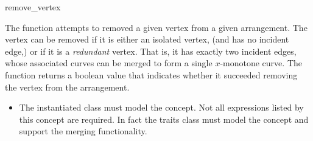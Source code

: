 \ccRefPageBegin

\begin{ccRefFunction}{remove_vertex}

\ccDefinition

The function \ccRefName{} attempts to removed a given vertex from a given
arrangement. The vertex can be removed if it is either an isolated vertex,
(and has no incident edge,) or if it is a {\em redundant} vertex. That
is, it has exactly two incident edges, whose associated curves can be
merged to form a single $x$-monotone curve.
The function returns a boolean value that indicates whether it succeeded
removing the vertex from the arrangement.



\ccRequirements
\begin{itemize}
\item The instantiated  class must model the
   concept. Not all expressions listed 
  by this concept are required. In fact the traits class must model the 
   concept and support the merging
  functionality.
\end{itemize}
	       
\end{ccRefFunction}

\ccRefPageEnd
